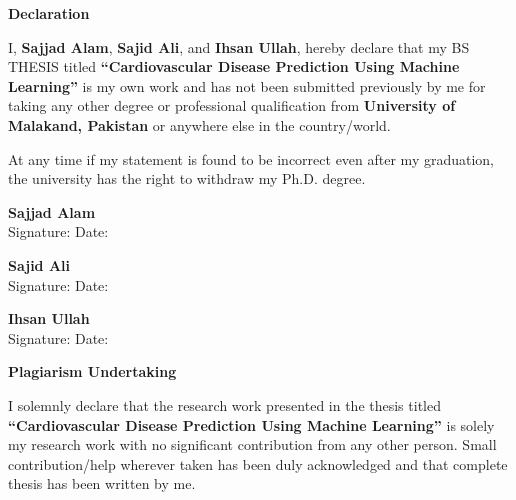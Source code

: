\documentclass[12pt, a4paper, oneside]{book}
\newcommand{\thesistitle}{Cardiovascular Disease Prediction Using Machine Learning}
\newcommand{\thesisauthorA}{Sajjad Alam}
\newcommand{\thesisauthorB}{Sajid Ali}
\newcommand{\thesisauthorC}{Ihsan Ullah}
\newcommand{\thesisuni}{University of Malakand}
\begin{document}
\setcounter{page}{2}

\clearpage
\thispagestyle{plain}
\vspace*{0.5cm}
\begin{center}
{\fontsize{14pt}{16pt}\selectfont \textbf{Declaration}\par}
\end{center}
\vspace{0.4in}

\noindent I, \textbf{\thesisauthorA}, \textbf{\thesisauthorB}, and \textbf{\thesisauthorC}, hereby declare that my BS THESIS titled \textbf{``\thesistitle''} is my own work and has not been submitted previously by me for taking any other degree or professional qualification from \textbf{\thesisuni, Pakistan} or anywhere else in the country/world.

\noindent At any time if my statement is found to be incorrect even after my graduation, the university has the right to withdraw my Ph.D. degree.

\vspace{1.2in}

\noindent \textbf{\thesisauthorA}\\
Signature: \hrulefill \quad Date: \hrulefill

\vspace{0.3in}
\noindent \textbf{\thesisauthorB}\\
Signature: \hrulefill \quad Date: \hrulefill

\vspace{0.3in}
\noindent \textbf{\thesisauthorC}\\
Signature: \hrulefill \quad Date: \hrulefill

\clearpage
\thispagestyle{plain}
\vspace*{0.5cm}
\begin{center}
{\fontsize{14pt}{16pt}\selectfont \textbf{Plagiarism Undertaking}\par}
\end{center}
\vspace{0.4in}

\noindent I solemnly declare that the research work presented in the thesis titled \textbf{``\thesistitle''} is solely my research work with no significant contribution from any other person. Small contribution/help wherever taken has been duly acknowledged and that complete thesis has been written by me.
\end{document}

